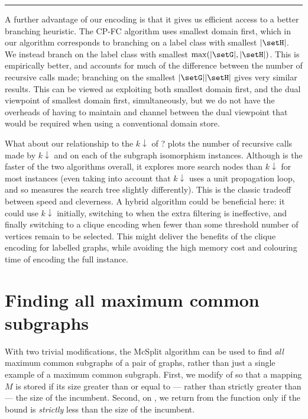 \hrule

A further advantage of our encoding is that it gives us efficient access to a
better branching heuristic. The CP-FC algorithm uses smallest domain first,
which in our algorithm corresponds to branching on a label class with smallest
$|\setH|$. We instead branch on the label class with smallest $\max(|\setG|,|\setH|)$.
This is empirically better, and accounts for much of the difference between
the number of recursive calls made; branching on the smallest $|\setG| |\setH|$ gives
very similar results. This can be viewed as exploiting both smallest domain first,
and the dual viewpoint \citep{DBLP:conf/ecai/Geelen92} of smallest domain
first, simultaneously, but we do not have the overheads of having to maintain
and channel between the dual viewpoint that would be required when using a
conventional domain store.

What about our relationship to the $k{\downarrow}$ of
\citet{UpcomingAAAIPaper}?   plots the number of
recursive calls made by $k{\downarrow}$ and \McSplit{$\downarrow$} on each of the subgraph
isomorphism instances. Although \McSplit{$\downarrow$} is the faster of the two algorithms overall, it
explores more search nodes than $k{\downarrow}$ for most instances (even taking
into account that $k{\downarrow}$ uses a unit propagation loop, and so measures
the search tree slightly differently). This is the classic tradeoff between
speed and cleverness. A hybrid algorithm could be beneficial here: it could use
$k{\downarrow}$ initially, switching to \McSplit{$\downarrow$} when the extra filtering is
ineffective, and finally switching to a clique encoding when fewer than some
threshold number of vertices remain to be selected. This might deliver the
benefits of the clique encoding for labelled graphs, while avoiding the high
memory cost and colouring time of encoding the full instance.

\section{Finding all maximum common subgraphs}

With two trivial modifications, the McSplit algorithm can be used to find
\emph{all} maximum common subgraphs of a pair of graphs, rather than just a single
example of a maximum common subgraph.
First, we modify  of  so that
a mapping $M$ is stored if its size greater than or equal to --- rather than
strictly greater than --- the size of the incumbent.  Second, on ,
we return from the function only if the bound is \emph{strictly} less than the
size of the incumbent.

